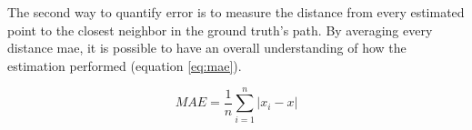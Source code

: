 The second way to quantify error is to measure the distance from every estimated point to the closest neighbor in the ground truth's path. By averaging every distance \acrfull{mae}, it is possible to have an overall understanding of how the estimation performed (equation \ref{eq:mae}).

\begin{figure}[!h]
    \centering
    \begin{subfigure}{0.75\textwidth}
        \centering
        \resizebox{1\linewidth}{!}{}
        \label{fig:square3D_error}
    \end{subfigure}


    \begin{subfigure}{0.75\textwidth}
        \centering
        \resizebox{1\linewidth}{!}{}
        \label{fig:square3D_point}
    \end{subfigure}
    \label{fig:error_methods_3D}
\end{figure}


\begin{equation}
    MAE = \frac{1}{n}\sum_{i = 1}^{n} \left\lvert x_i - x\right\rvert
    \label{eq:mae}
\end{equation}


